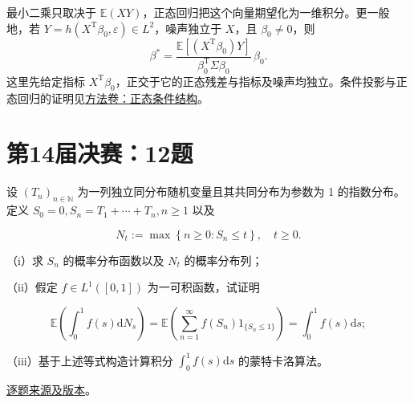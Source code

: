 \documentclass[UTF8,12pt,a4paper,fontset=fandol]{ctexbook}
\begin{document}
\begin{remark}[方法与条件]

最小二乘只取决于 $\mathbb E(XY)$，正态回归把这个向量期望化为一维积分。更一般地，若 $Y=h(X^{\mathrm T}\beta_0,\varepsilon)\in L^2$，噪声独立于 $X$，且 $\beta_0\ne0$，则
\[
\beta^*=\frac{\mathbb E[(X^{\mathrm T}\beta_0)Y]}{\beta_0^{\mathrm T}\Sigma\beta_0}\,\beta_0.
\]
这里先给定指标 $X^{\mathrm T}\beta_0$，正交于它的正态残差与指标及噪声均独立。条件投影与正态回归的证明见\hyperref[app:probability-gaussian]{方法卷：正态条件结构}。

\end{remark}

\section{第14届决赛：12题}\label{pr:fin14-high:12}

\begin{example}[公开题解转录]\label{q:fin14-high:12}

设 $\left(T_n\right)_{n \in \mathbb{N}}$ 为一列独立同分布随机变量且其共同分布为参数为 1 的指数分布。定义 $S_0 = 0, S_n = T_1 + \cdots + T_n, n \geq 1$ 以及

\[
N_t := \max \left\{n \geq 0 : S_n \leq t\right\},\quad t \geq 0.
\]

（i）求 $S_n$ 的概率分布函数以及 $N_t$ 的概率分布列；

（ii）假定 $f \in L^1([0,1])$ 为一可积函数，试证明

\[
\mathbb{E}\left(\int_0^1 f(s) \mathrm{d}N_s\right) = \mathbb{E}\left(\sum_{n=1}^{\infty} f\left(S_n\right)1_{\{S_n \leq 1\}}\right) = \int_0^1 f(s) \mathrm{d}s;
\]

（iii）基于上述等式构造计算积分 $\int_0^1 f(s) \mathrm{d}s$ 的蒙特卡洛算法。

\end{example}

\href{https://github.com/lzxcr/cmc-mathematics/blob/64916fa1fdbc3e444a652eca204d5669058ee321/src/problems/finals/14/15.md}{逐题来源及版本}。
\end{document}
